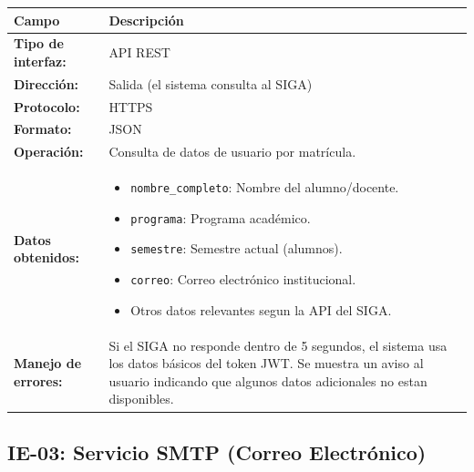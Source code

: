 \begin{table}[H]
\centering
\begin{tabular}{|L{3.5cm}|L{10cm}|}
    \hline
    \textbf{Campo} & \textbf{Descripción} \\
    \hline
    \textbf{Tipo de interfaz:} & API REST \\
    \hline
    \textbf{Dirección:} & Salida (el sistema consulta al SIGA) \\
    \hline
    \textbf{Protocolo:} & HTTPS \\
    \hline
    \textbf{Formato:} & JSON \\
    \hline
    \textbf{Operación:} & Consulta de datos de usuario por matrícula. \\
    \hline
    \textbf{Datos obtenidos:} &
    \begin{itemize}[nosep, leftmargin=*]
        \item \texttt{nombre\_completo}: Nombre del alumno/docente.
        \item \texttt{programa}: Programa académico.
        \item \texttt{semestre}: Semestre actual (alumnos).
        \item \texttt{correo}: Correo electrónico institucional.
        \item Otros datos relevantes segun la API del SIGA.
    \end{itemize} \\
    \hline
    \textbf{Manejo de errores:} & Si el SIGA no responde dentro de 5 segundos, el sistema usa los datos básicos del token JWT. Se muestra un aviso al usuario indicando que algunos datos adicionales no estan disponibles. \\
    \hline
\end{tabular}
\end{table}

\subsection{IE-03: Servicio SMTP (Correo Electrónico)}

